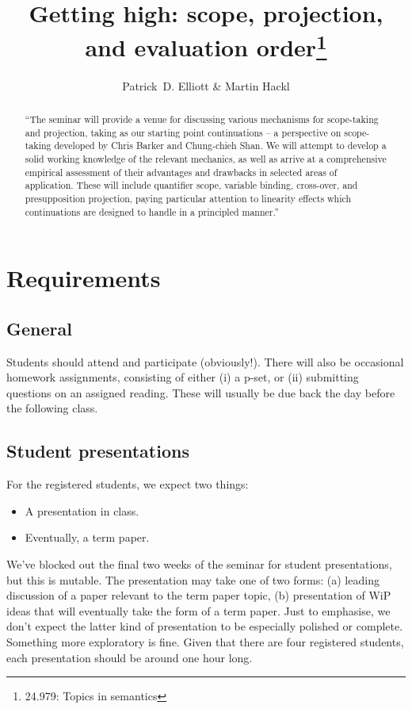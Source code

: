 \documentclass[nols,twoside,nofonts,nobib,nohyper]{tufte-handout}
\title{Getting high: scope, projection, and evaluation order\thanks{24.979: Topics in
    semantics}}
\author[Patrick D. Elliott and Martin Hackl]{Patrick~D. Elliott\sidenote{\texttt{pdell@mit.edu}} \& Martin Hackl\sidenote{\texttt{hackl@mit.edu}}}
\begin{document}
\maketitle%

\begin{abstract}
\enquote{The seminar will provide a venue for discussing various mechanisms for scope-taking and projection, taking as our starting point continuations -- a perspective on scope-taking developed by Chris Barker and Chung-chieh Shan. We will attempt to develop a solid working knowledge of the relevant mechanics, as well as arrive at a comprehensive empirical assessment of their advantages and drawbacks in selected areas of application. These will include quantifier scope, variable binding, cross-over, and presupposition projection, paying particular attention to linearity effects which continuations are designed to handle in a principled manner.}
\end{abstract}

\section{Requirements}

\subsection{General}

Students should attend and participate (obviously!). There will also
be occasional homework assignments, consisting of either (i) a p-set, or (ii)
submitting questions on an assigned reading. These will usually be due back the
day before the following class.

\subsection{Student presentations}

For the registered students, we expect two things:

\begin{itemize}

  \item A presentation in class.

  \item Eventually, a term paper.

\end{itemize}

We've blocked out the final two weeks of the seminar for student presentations,
but this is mutable. The presentation may take one of two forms: (a)
leading discussion of a paper relevant to the term paper topic, (b)
presentation of WiP ideas that will eventually take the form of a term paper.
Just to emphasise, we don't expect the latter kind of presentation to be
especially polished or complete. Something more exploratory is fine. Given that
there are four registered students, each presentation should be around one hour long.
\end{document}
